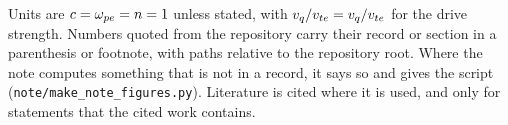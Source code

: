 Units are $c=\omega_{pe}=n=1$ unless stated, with $v_q/v_{te}=v_q/v_{te}$ for the drive strength. Numbers quoted from the repository carry their record or section in a parenthesis or footnote, with paths relative to the repository root. Where the note computes something that is not in a record, it says so and gives the script (\texttt{note/make\_note\_figures.py}). Literature is cited where it is used, and only for statements that the cited work contains.
